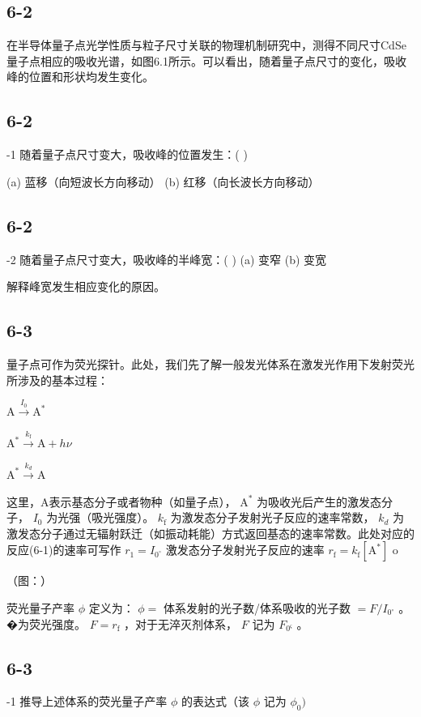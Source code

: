 \subsection*{6-2}
在半导体量⼦点光学性质与粒⼦尺⼨关联的物理机制研究中，测得不同尺⼨CdSe量⼦点相应的吸收光谱，如图6.1所⽰。可以看出，随着量⼦点尺⼨的变化，吸收峰的位置和形状均发⽣变化。

\subsection*{6-2}
-1 随着量⼦点尺⼨变⼤，吸收峰的位置发⽣：( )

(a) 蓝移（向短波⻓⽅向移动） (b) 红移（向⻓波⻓⽅向移动）

\subsection*{6-2}
-2 随着量⼦点尺⼨变⼤，吸收峰的半峰宽：( ) (a) 变窄 (b) 变宽

解释峰宽发⽣相应变化的原因。

\subsection*{6-3}
量⼦点可作为荧光探针。此处，我们先了解⼀般发光体系在激发光作⽤下发射荧光所涉及的基本过程：

$
\mathrm{A} \xrightarrow {I _ {0}} \mathrm{A} ^ {*}\tag{6-1}
$

$
\mathrm{A} ^ {*} \xrightarrow {k _ {\mathrm{f}}} \mathrm{A} + h \nu\tag{6-2}
$

$
\mathrm{A} ^ {*} \xrightarrow {k _ {d}} \mathrm{A}\tag{6-3}
$

这⾥，A表⽰基态分⼦或者物种（如量⼦点）， $\mathrm { A } ^ { \ast }$ 为吸收光后产⽣的激发态分⼦， $I _ { 0 }$ 为光强（吸光强度）。 $k _ { \mathrm { f } }$ 为激发态分⼦发射光⼦反应的速率常数， $k _ { d }$ 为激发态分⼦通过⽆辐射跃迁（如振动耗能）⽅式返回基态的速率常数。此处对应的反应(6-1)的速率可写作 $r _ { 1 } = I _ { 0 ^ { \circ } }$ 激发态分⼦发射光⼦反应的速率 $r _ { \mathrm { f } } = k _ { \mathrm { f } } [ \mathrm { A } ^ { \ast } ]$ o

（图：）

荧光量⼦产率 $\phi$ 定义为： $\phi =$ 体系发射的光⼦数/体系吸收的光⼦数 $= F / I _ { 0 ^ { \circ } }$ 。�为荧光强度。 $F = r _ { \mathrm { f } }$ ，对于⽆淬灭剂体系， $F$ 记为 $F _ { 0 ^ { \varsigma } }$ 。

\subsection*{6-3}
-1 推导上述体系的荧光量⼦产率 $\phi$ 的表达式（该 $\phi$ 记为 $\phi _ { 0 } )$

